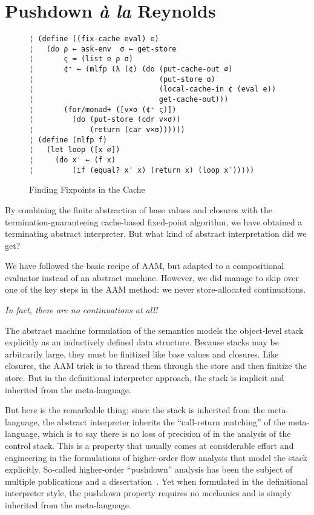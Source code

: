 \section{Pushdown \emph{à la} Reynolds}\label{s:reynolds}

\begin{figure} %
\begin{lstlisting}
¦ (define ((fix-cache eval) e)  
¦   (do ρ ← ask-env  σ ← get-store
¦       ς ≔ (list e ρ σ)
¦       ¢⁺ ← (mlfp (λ (¢) (do (put-cache-out ∅)
¦                             (put-store σ)
¦                             (local-cache-in ¢ (eval e))
¦                             get-cache-out)))
¦       (for/monad+ ([v×σ (¢⁺ ς)])
¦         (do (put-store (cdr v×σ))
¦             (return (car v×σ))))))
¦ (define (mlfp f)
¦   (let loop ([x ∅])
¦     (do x′ ← (f x)
¦         (if (equal? x′ x) (return x) (loop x′)))))
\end{lstlisting}
\vspace{-0.75em}
\caption{Finding Fixpoints in the Cache}
\label{f:fixing}
\vspace{-1em}
\end{figure} %

By combining the finite abstraction of base values and closures with the
termination-guaranteeing cache-based fixed-point algorithm, we have obtained a
terminating abstract interpreter.  But what kind of abstract interpretation did
we get?

We have followed the basic recipe of AAM, but adapted to a compositional
evaluator instead of an abstract machine.  However, we did manage to skip over
one of the key steps in the AAM method: we never store-allocated continuations.
\begin{center}
\emph{In fact, there are no continuations at all!}
\end{center}
The abstract machine formulation of the semantics models the object-level stack
explicitly as an inductively defined data structure.  Because stacks may be
arbitrarily large, they must be finitized like base values and closures.  Like
closures, the AAM trick is to thread them through the store and then finitize
the store.  But in the definitional interpreter approach, the stack is implicit
and inherited from the meta-language.

But here is the remarkable thing: since the stack is inherited from the
meta-language, the abstract interpreter inherits the ``call-return matching''
of the meta-language, which is to say there is no loss of precision of in the
analysis of the control stack.  This is a property that usually comes at
considerable effort and engineering in the formulations of higher-order flow
analysis that model the stack explicitly.  So-called higher-order ``pushdown''
analysis has been the subject of multiple publications and a
dissertation~\cite%
{dvanhorn:Vardoulakis2011CFA2%
,dvanhorn:Earl2010Pushdown%
,local:vardoulakis-diss12%
,dvanhorn:VanHorn2012Systematic%
,dvanhorn:Earl2012Introspective%
,dvanhorn:Johnson2014Abstracting%
,dvanhorn:Johnson2014Pushdown%
,local:p4f%
}. Yet when formulated in the definitional interpreter style, the pushdown
property requires no mechanics and is simply inherited from the meta-language.

